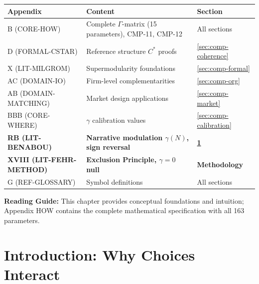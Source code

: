 \begin{tcolorbox}[
    colback=yellow!10!white,
    colframe=orange!75!black,
    title={\textbf{Appendix References for This Chapter}},
    fonttitle=\bfseries
]
\begin{tabular}{lll}
\textbf{Appendix} & \textbf{Content} & \textbf{Section} \\
\midrule
B (CORE-HOW) & Complete $\Gamma$-matrix (15 parameters), CMP-11, CMP-12 & All sections \\
D (FORMAL-CSTAR) & Reference structure $C^*$ proofs & \ref{sec:comp-coherence} \\
X (LIT-MILGROM) & Supermodularity foundations & \ref{sec:comp-formal} \\
AC (DOMAIN-IO) & Firm-level complementarities & \ref{sec:comp-org} \\
AB (DOMAIN-MATCHING) & Market design applications & \ref{sec:comp-market} \\
BBB (CORE-WHERE) & $\gamma$ calibration values & \ref{sec:comp-calibration} \\
\textbf{RB (LIT-BENABOU)} & \textbf{Narrative modulation $\gamma(N)$, sign reversal} & \textbf{\ref{sec:comp-intro}} \\
\textbf{XVIII (LIT-FEHR-METHOD)} & \textbf{Exclusion Principle, $\gamma = 0$ null} & \textbf{Methodology} \\
G (REF-GLOSSARY) & Symbol definitions & All sections
\end{tabular}

\medskip
\textbf{Reading Guide:} This chapter provides conceptual foundations and intuition;
Appendix HOW contains the complete mathematical specification with all 163 parameters.
\end{tcolorbox}



\section{Introduction: Why Choices Interact}
\label{sec:comp-intro}


